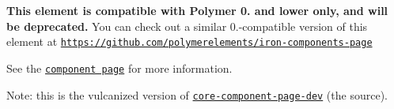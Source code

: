 {\bfseries This element is compatible with Polymer 0. and lower only, and will be deprecated.} You can check out a similar 0.-\/compatible version of this element at \href{https://github.com/polymerelements/iron-component-page}{\tt https\+://github.\+com/polymerelements/iron-\/components-\/page}

See the \href{https://www.polymer-project.org/0.5/docs/elements/core-component-page.html}{\tt component page} for more information.

Note\+: this is the vulcanized version of \href{https://github.com/Polymer/core-component-page-dev}{\tt {\ttfamily core-\/component-\/page-\/dev}} (the source). 